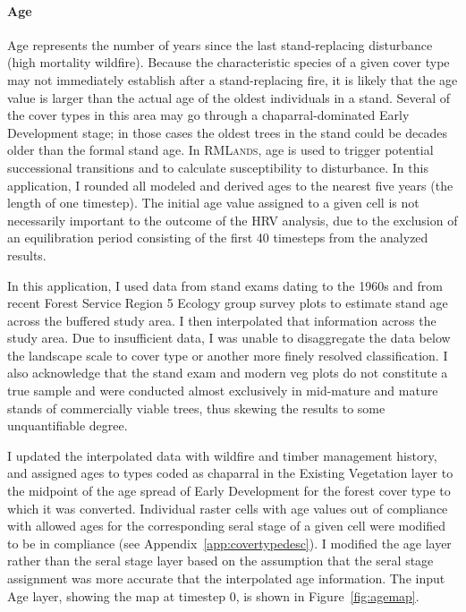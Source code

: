 \paragraph*{Age}
Age represents the number of years since the last stand-replacing disturbance (high mortality wildfire). Because the characteristic species of a given cover type may not immediately establish after a stand-replacing fire, it is likely that the age value is larger than the actual age of the oldest individuals in a stand. Several of the cover types in this area may go through a chaparral-dominated Early Development stage; in those cases the oldest trees in the stand could be decades older than the formal stand age. In \textsc{RMLands}, age is used to trigger potential successional transitions and to calculate susceptibility to disturbance. In this application, I rounded all modeled and derived ages to the nearest five years (the length of one timestep). The initial age value assigned to a given cell is not necessarily important to the outcome of the HRV analysis, due to the exclusion of an equilibration period consisting of the first 40 timesteps from the analyzed results.

In this application, I used data from stand exams dating to the 1960s and from recent Forest Service Region 5 Ecology group survey plots to estimate stand age across the buffered study area. I then interpolated that information across the study area. Due to insufficient data, I was unable to disaggregate the data below the landscape scale to cover type or another more finely resolved classification. I also acknowledge that the stand exam and modern veg plots do not constitute a true sample and were conducted almost exclusively in mid-mature and mature stands of commercially viable trees, thus skewing the results to some unquantifiable degree.

I updated the interpolated data with wildfire and timber management history, and assigned ages to types coded as chaparral in the Existing Vegetation layer to the midpoint of the age spread of Early Development for the forest cover type to which it was converted. Individual raster cells with age values out of compliance with allowed ages for the corresponding seral stage of a given cell were modified to be in compliance (see Appendix~\ref{app:covertypedesc}). I modified the age layer rather than the seral stage layer based on the assumption that the seral stage assignment was more accurate that the interpolated age information. The input Age layer, showing the map at timestep 0, is shown in Figure~\ref{fig:agemap}.


